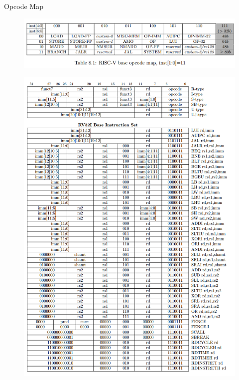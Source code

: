 \documentclass[UTF8]{ctexbeamer}
\begin{document}
\begin{frame}{Opcode Map}
\begin{figure}
\centering
\includegraphics[width=\linewidth]{fig/Lecture2/opcode_map.PNG}
\end{figure}
\end{frame}

\begin{frame}
\begin{figure}
\centering
\includegraphics[width=0.5\linewidth]{fig/Lecture2/base32.PNG}
\end{figure}
\end{frame}
\end{document}
